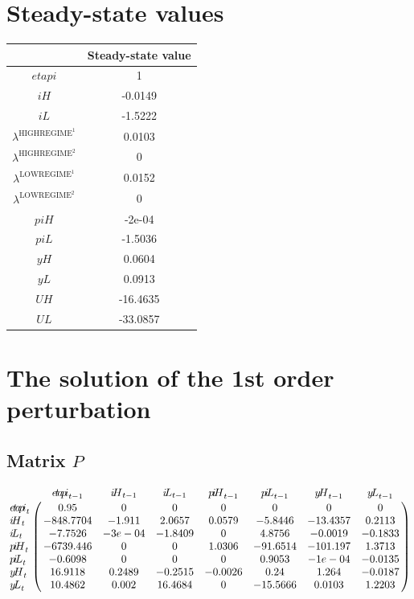 

\section{Steady-state values}


\begin{tabular}{c|c|}
  & Steady-state value\\
\hline
${e\!t\!a\!p\!i}$ & 1 \\
${i\!H}$ & -0.0149 \\
${i\!L}$ & -1.5222 \\
$\lambda^{\mathrm{HIGHREGIME}^{\mathrm{1}}}$ & 0.0103 \\
$\lambda^{\mathrm{HIGHREGIME}^{\mathrm{2}}}$ & 0 \\
$\lambda^{\mathrm{LOWREGIME}^{\mathrm{1}}}$ & 0.0152 \\
$\lambda^{\mathrm{LOWREGIME}^{\mathrm{2}}}$ & 0 \\
${p\!i\!H}$ & -2e-04 \\
${p\!i\!L}$ & -1.5036 \\
${y\!H}$ & 0.0604 \\
${y\!L}$ & 0.0913 \\
${U\!H}$ & -16.4635 \\
${U\!L}$ & -33.0857 \\
\hline
\end{tabular}


\section{The solution of the 1st order perturbation}

\subsection*{Matrix $P$}

$$\bordermatrix{
~ & {e\!t\!a\!p\!i}_{t-1} & {i\!H}_{t-1} & {i\!L}_{t-1} & {p\!i\!H}_{t-1} & {p\!i\!L}_{t-1} & {y\!H}_{t-1} & {y\!L}_{t-1} \cr
{e\!t\!a\!p\!i}_{t} & 0.95 & 0 & 0 & 0 & 0 & 0 & 0 \cr
{i\!H}_{t} & -848.7704 & -1.911 & 2.0657 & 0.0579 & -5.8446 & -13.4357 & 0.2113 \cr
{i\!L}_{t} & -7.7526 & -3e-04 & -1.8409 & 0 & 4.8756 & -0.0019 & -0.1833 \cr
{p\!i\!H}_{t} & -6739.446 & 0 & 0 & 1.0306 & -91.6514 & -101.197 & 1.3713 \cr
{p\!i\!L}_{t} & -0.6098 & 0 & 0 & 0 & 0.9053 & -1e-04 & -0.0135 \cr
{y\!H}_{t} & 16.9118 & 0.2489 & -0.2515 & -0.0026 & 0.24 & 1.264 & -0.0187 \cr
{y\!L}_{t} & 10.4862 & 0.002 & 16.4684 & 0 & -15.5666 & 0.0103 & 1.2203 \cr
}$$

